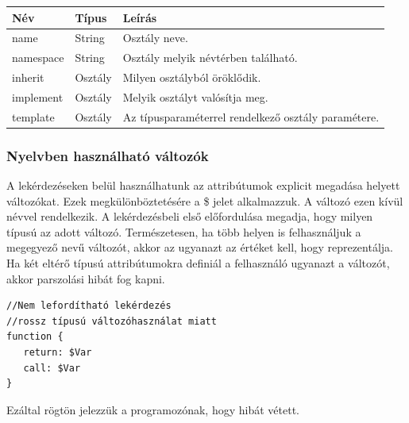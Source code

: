 \documentclass[a4paper,12pt]{report}
\begin{document}
\begin{center}
	\begin{tabular}{| l | l | l |}
		\hline
		Név & Típus & Leírás \\ \hline
		name & String & Osztály neve. \\ \hline
		namespace & String & Osztály melyik névtérben található. \\ \hline
		inherit & Osztály & Milyen osztályból öröklődik. \\ \hline
		implement & Osztály & Melyik osztályt valósítja meg. \\ \hline
		template & Osztály & Az típusparaméterrel rendelkező osztály paramétere. \\ \hline
	\end{tabular}
\end{center}
\subsubsection{Nyelvben használható változók}
A lekérdezéseken belül használhatunk az attribútumok explicit megadása helyett változókat. Ezek megkülönböztetésére a \$ jelet alkalmazzuk. A változó ezen kívül névvel rendelkezik. A lekérdezésbeli első előfordulása megadja, hogy milyen típusú az adott változó. Természetesen, ha több helyen is felhasználjuk a megegyező nevű változót, akkor az ugyanazt az értéket kell, hogy reprezentálja. Ha két eltérő típusú attribútumokra definiál a felhasználó ugyanazt a változót, akkor parszolási hibát fog kapni.
\begin{verbatim}
//Nem lefordítható lekérdezés
//rossz típusú változóhasználat miatt
function {
   return: $Var
   call: $Var
}
\end{verbatim}
Ezáltal rögtön jelezzük a programozónak, hogy hibát vétett.
\end{document}
